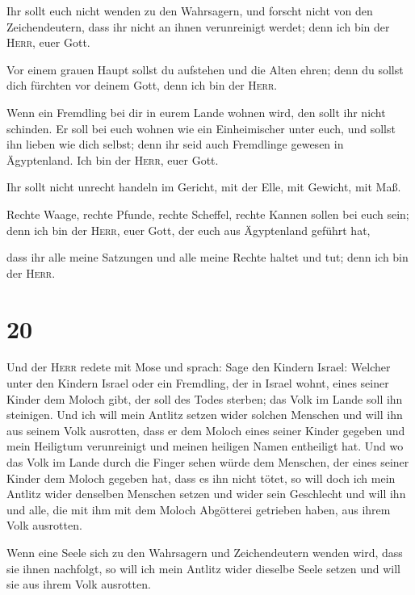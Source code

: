 Ihr sollt euch nicht wenden zu den Wahrsagern, und
forscht nicht von den Zeichendeutern, dass ihr nicht an ihnen
verunreinigt werdet; denn ich bin der \textsc{Herr}, euer Gott.

 Vor einem grauen Haupt sollst du aufstehen und die Alten
ehren; denn du sollst dich fürchten vor deinem Gott, denn ich bin der
\textsc{Herr}.

 Wenn ein Fremdling bei dir in eurem Lande wohnen wird,
den sollt ihr nicht schinden.  Er soll bei euch wohnen
wie ein Einheimischer unter euch, und sollst ihn lieben wie dich selbst;
denn ihr seid auch Fremdlinge gewesen in Ägyptenland. Ich bin der
\textsc{Herr}, euer Gott.

 Ihr sollt nicht unrecht handeln im Gericht, mit der
Elle, mit Gewicht, mit Maß.

 Rechte Waage, rechte Pfunde, rechte Scheffel, rechte
Kannen sollen bei euch sein; denn ich bin der \textsc{Herr}, euer Gott,
der euch aus Ägyptenland geführt hat,

 dass ihr alle meine Satzungen und alle meine Rechte
haltet und tut; denn ich bin der \textsc{Herr}.

\hypertarget{section-19}{%
\section{20}\label{section-19}}

 Und der \textsc{Herr} redete mit Mose und sprach:
 Sage den Kindern Israel: Welcher unter den Kindern Israel
oder ein Fremdling, der in Israel wohnt, eines seiner Kinder dem Moloch
gibt, der soll des Todes sterben; das Volk im Lande soll ihn steinigen.
 Und ich will mein Antlitz setzen wider solchen Menschen
und will ihn aus seinem Volk ausrotten, dass er dem Moloch eines seiner
Kinder gegeben und mein Heiligtum verunreinigt und meinen heiligen Namen
entheiligt hat.  Und wo das Volk im Lande durch die Finger
sehen würde dem Menschen, der eines seiner Kinder dem Moloch gegeben
hat, dass es ihn nicht tötet,  so will doch ich mein
Antlitz wider denselben Menschen setzen und wider sein Geschlecht und
will ihn und alle, die mit ihm mit dem Moloch Abgötterei getrieben
haben, aus ihrem Volk ausrotten.

 Wenn eine Seele sich zu den Wahrsagern und Zeichendeutern
wenden wird, dass sie ihnen nachfolgt, so will ich mein Antlitz wider
dieselbe Seele setzen und will sie aus ihrem Volk ausrotten.

